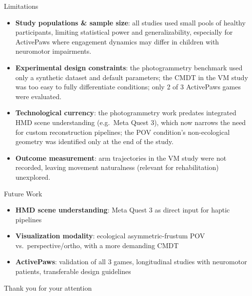 \documentclass[aspectratio=169, 12pt]{beamer}
\begin{document}
\begin{frame}{Limitations}
\begin{itemize}
    \item \textbf{Study populations \& sample size}: all studies used small pools of healthy participants, limiting statistical power and generalizability, especially for ActivePaws where engagement dynamics may differ in children with neuromotor impairments.
    \item \textbf{Experimental design constraints}: the photogrammetry benchmark used only a synthetic dataset and default parameters; the CMDT in the VM study was too easy to fully differentiate conditions; only 2 of 3 ActivePaws games were evaluated.
    \item \textbf{Technological currency}: the photogrammetry work predates integrated HMD scene understanding (e.g.\ Meta Quest 3), which now narrows the need for custom reconstruction pipelines; the POV condition's non-ecological geometry was identified only at the end of the study.
    \item \textbf{Outcome measurement}: arm trajectories in the VM study were not recorded, leaving movement naturalness (relevant for rehabilitation) unexplored.
\end{itemize}
\end{frame}

\begin{frame}{Future Work}
\begin{itemize}
    \item \textbf{HMD scene understanding}: Meta Quest 3 as direct input for haptic pipelines
    \item \textbf{Visualization modality}: ecological asymmetric-frustum POV vs.\ perspective/ortho, with a more demanding CMDT
    \item \textbf{ActivePaws}: validation of all 3 games, longitudinal studies with neuromotor patients, transferable design guidelines
\end{itemize}
\end{frame}

\begin{frame}{}
\centering
{\Huge Thank you for your attention}
\end{frame}
\end{document}

